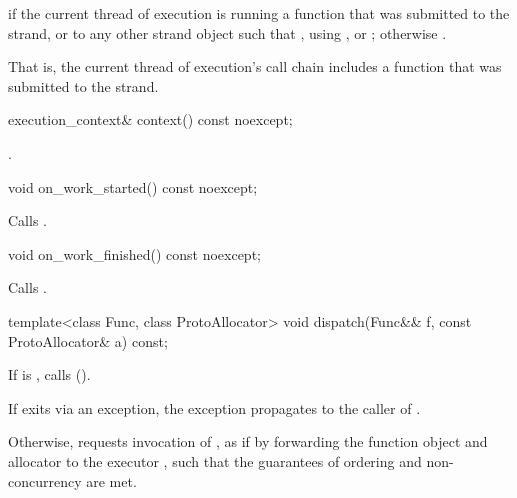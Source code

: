 \begin{itemdescr}
\pnum
\returns {} if the current thread of execution is running a function that was submitted to the strand, or to any other strand object  such that , using ,  or ; otherwise . \begin{note} That is, the current thread of execution's call chain includes a function that was submitted to the strand. \end{note}
\end{itemdescr}

%
\begin{itemdecl}
execution_context& context() const noexcept;
\end{itemdecl}

\begin{itemdescr}
\pnum
\returns {}.
\end{itemdescr}

%
\begin{itemdecl}
void on_work_started() const noexcept;
\end{itemdecl}

\begin{itemdescr}
\pnum
\effects Calls .
\end{itemdescr}

%
\begin{itemdecl}
void on_work_finished() const noexcept;
\end{itemdecl}

\begin{itemdescr}
\pnum
\effects Calls .
\end{itemdescr}

%
\begin{itemdecl}
template<class Func, class ProtoAllocator>
  void dispatch(Func&& f, const ProtoAllocator& a) const;
\end{itemdecl}

\begin{itemdescr}
\pnum
\effects If  is , calls  (). \begin{note} If  exits via an exception, the exception propagates to the caller of . \end{note} Otherwise, requests invocation of , as if by forwarding the function object  and allocator  to the executor , such that the guarantees of ordering and non-concurrency are met.
\end{itemdescr}

